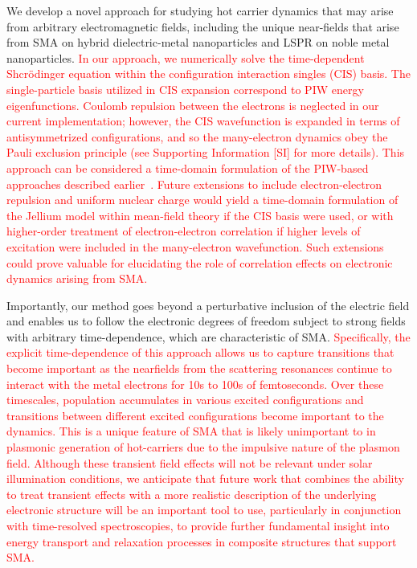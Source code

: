 \documentclass[journal=jpclcd,manuscript=article]{achemso}
\begin{document}
We develop a novel approach for studying hot carrier dynamics that may arise from arbitrary electromagnetic
fields, including the unique near-fields that arise from SMA on hybrid dielectric-metal nanoparticles and LSPR
on noble metal nanoparticles.  \textcolor{red}{In our approach, we numerically solve the time-dependent Shcr\"odinger
equation within the configuration interaction singles (CIS) basis.  The single-particle basis utilized in CIS
expansion correspond to PIW energy eigenfunctions.  Coulomb repulsion between the electrons is neglected in our current 
implementation; however, the CIS wavefunction is expanded in terms of antisymmetrized configurations, and so the
many-electron dynamics obey the Pauli exclusion principle  (see Supporting Information [SI] for more details).  This approach can be considered a time-domain formulation
of the PIW-based approaches described earlier~\cite{GZG_JPCC_2013,ZG_JPCC_2014,MLK_ACSNano_2014,KPB_SciRep_2015}.  Future 
extensions to include electron-electron repulsion and uniform nuclear charge would yield a time-domain formulation
of the Jellium model within mean-field theory if the CIS basis were used, or with higher-order treatment of
electron-electron correlation if higher levels of excitation were included in the many-electron wavefunction.  Such extensions
could prove valuable for elucidating the role of correlation effects on electronic dynamics arising from SMA.} 

Importantly, our method goes beyond a perturbative inclusion of the electric field and enables 
us to follow the electronic degrees of freedom subject to strong fields with arbitrary time-dependence, which are characteristic of SMA.   
\textcolor{red}{Specifically, the explicit time-dependence of this approach allows us to capture transitions that become 
important as the nearfields from the scattering resonances continue to interact with the metal electrons 
for 10s to 100s of femtoseconds.  Over these timescales, population accumulates in  
various excited configurations and transitions between different excited configurations become important to the dynamics.  
This is a unique feature of SMA that is likely unimportant to in plasmonic generation of hot-carriers due to the impulsive 
nature of the plasmon field.  Although these transient field effects will not be relevant under
solar illumination conditions, we anticipate that future work that combines the ability to treat transient effects with 
a more realistic description of the underlying electronic structure will be an important tool to use, particularly in conjunction with
time-resolved spectroscopies, to provide further fundamental insight into energy transport and relaxation processes
in composite structures that support SMA.}   
\end{document}
